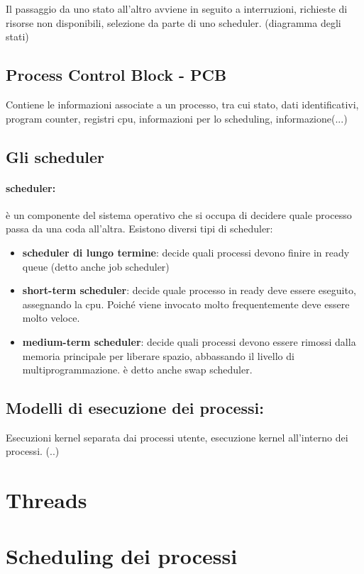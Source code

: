 \documentclass{article}
\begin{document}
Il passaggio da uno stato all'altro avviene in seguito a interruzioni, richieste di risorse non disponibili, selezione da parte di uno scheduler.
(diagramma degli stati)

\subsection{Process Control Block - PCB}
Contiene le informazioni associate a un processo, tra cui stato, dati identificativi, program counter, registri cpu, informazioni per lo scheduling, 
informazione(...)

\subsection{Gli scheduler}
\paragraph{scheduler:} è un componente del sistema operativo che si occupa di decidere quale processo passa da una coda all'altra.
Esistono diversi tipi di scheduler:
\begin{itemize}
    \item \textbf{scheduler di lungo termine}: decide quali processi devono finire in ready queue (detto anche job scheduler)
    \item \textbf{short-term scheduler}: decide quale processo in ready deve essere eseguito, assegnando la cpu. Poiché viene invocato molto frequentemente deve essere molto veloce.
    \item \textbf{medium-term scheduler}: decide quali processi devono essere rimossi dalla memoria principale per liberare spazio, abbassando il livello di multiprogrammazione. è detto anche swap scheduler.
\end{itemize}

\subsection{Modelli di esecuzione dei processi:}
Esecuzioni kernel separata dai processi utente, esecuzione kernel all'interno dei processi. (..)
\section{Threads}
\section{Scheduling dei processi}
\end{document}

